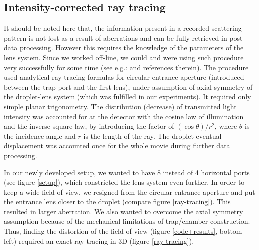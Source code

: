 \documentclass[preprint,review,12pt,dvips]{elsarticle}
\begin{document}
\subsection{Intensity-corrected ray tracing}
It should be noted here that, the information present in a recorded scattering pattern is not lost as a result of
aberrations and can be fully retrieved in post data processing. However this requires the knowledge of the parameters of
the lens system. Since we worked off-line, we could and were using such procedure very successfully for some time (see
e.g.: \cite{liquids,RoP,Hi-precission,HK-soft_matter} and references therein). The procedure used analytical ray tracing
formulas for circular entrance aperture (introduced between the trap port and the first lens), under assumption of axial
symmetry of the droplet-lens system (which was fulfilled in our experiments). It required only simple planar trigonometry.
The distribution (decrease) of transmitted light intensity was accounted for at the detector with the cosine law of
illumination and the inverse square law, by introducing the factor of $(\cos \theta) /r^2$, where $\theta$ is the
incidence angle and $r$ is the length of the ray. The droplet eventual displacement was accounted once for the whole movie
during further data processing.

In our newly developed setup, we wanted to have 8 instead of 4 horizontal ports (see figure \ref{setup}), which
constricted the lens system even further. In order to keep a wide field of view, we resigned from the circular entrance
aperture and put the entrance lens closer to the droplet (compare figure \ref{ray-tracing}). This resulted in larger
aberration. We also wanted to overcome the axial symmetry assumption because of the mechanical limitations of trap/chamber
construction. Thus, finding the distortion of the field of view (figure \ref{code+results}, bottom-left) required an exact
ray tracing in 3D (figure \ref{ray-tracing}).
\end{document}
